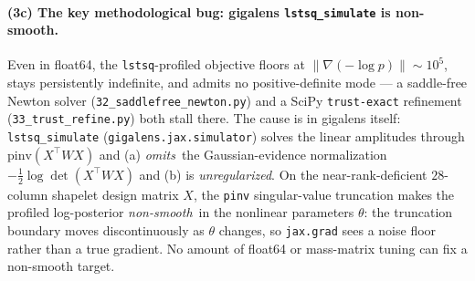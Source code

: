\documentclass[11pt,letterpaper]{article}
\begin{document}
\paragraph{(3c) The key methodological bug: gigalens
\texttt{lstsq\_simulate} is non-smooth.} Even in float64, the
\texttt{lstsq}-profiled objective floors at $\|\nabla(-\log p)\|\sim
10^{5}$, stays persistently indefinite, and admits no positive-definite
mode --- a saddle-free Newton solver (\texttt{32\_saddlefree\_newton.py})
and a SciPy \texttt{trust-exact} refinement (\texttt{33\_trust\_refine.py})
both stall there. The cause is in gigalens itself: \texttt{lstsq\_simulate}
(\texttt{gigalens.jax.simulator}) solves the linear amplitudes through
$\mathrm{pinv}(X^{\!\top}WX)$ and (a) {\it omits}\ the Gaussian-evidence
normalization $-\tfrac12\log\det(X^{\!\top}WX)$ and (b) is
{\it unregularized}. On the near-rank-deficient $28$-column shapelet
design matrix $X$, the \texttt{pinv} singular-value truncation makes the
profiled log-posterior {\it non-smooth}\ in the nonlinear parameters
$\theta$: the truncation boundary moves discontinuously as $\theta$
changes, so \texttt{jax.grad} sees a noise floor rather than a true
gradient. No amount of float64 or mass-matrix tuning can fix a
non-smooth target.
\end{document}
